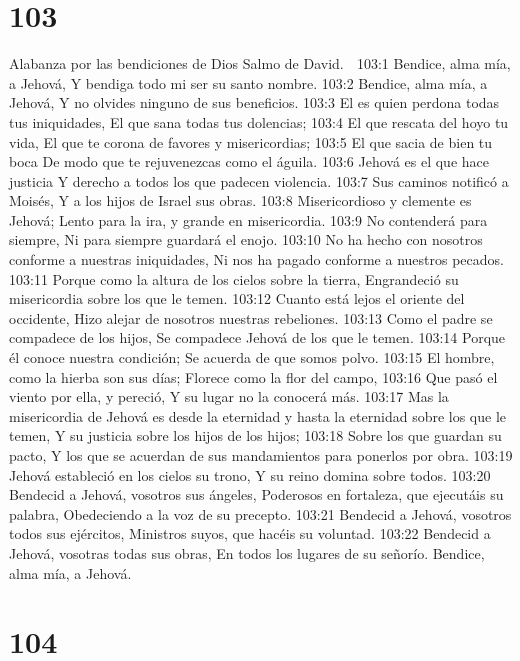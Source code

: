 \chapter{103}

Alabanza por las bendiciones de Dios 
Salmo de David. 

103:1 Bendice, alma mía, a Jehová, 
Y bendiga todo mi ser su santo nombre. 
103:2 Bendice, alma mía, a Jehová, 
Y no olvides ninguno de sus beneficios. 
103:3 El es quien perdona todas tus iniquidades, 
El que sana todas tus dolencias; 
103:4 El que rescata del hoyo tu vida, 
El que te corona de favores y misericordias; 
103:5 El que sacia de bien tu boca 
De modo que te rejuvenezcas como el águila. 
103:6 Jehová es el que hace justicia 
Y derecho a todos los que padecen violencia. 
103:7 Sus caminos notificó a Moisés, 
Y a los hijos de Israel sus obras. 
103:8 Misericordioso y clemente es Jehová; 
Lento para la ira, y grande en misericordia. 
103:9 No contenderá para siempre, 
Ni para siempre guardará el enojo. 
103:10 No ha hecho con nosotros conforme a nuestras iniquidades, 
Ni nos ha pagado conforme a nuestros pecados. 
103:11 Porque como la altura de los cielos sobre la tierra, 
Engrandeció su misericordia sobre los que le temen. 
103:12 Cuanto está lejos el oriente del occidente, 
Hizo alejar de nosotros nuestras rebeliones. 
103:13 Como el padre se compadece de los hijos, 
Se compadece Jehová de los que le temen. 
103:14 Porque él conoce nuestra condición; 
Se acuerda de que somos polvo. 
103:15 El hombre, como la hierba son sus días; 
Florece como la flor del campo, 
103:16 Que pasó el viento por ella, y pereció, 
Y su lugar no la conocerá más. 
103:17 Mas la misericordia de Jehová es desde la eternidad y hasta la eternidad sobre los que le temen, 
Y su justicia sobre los hijos de los hijos; 
103:18 Sobre los que guardan su pacto, 
Y los que se acuerdan de sus mandamientos para ponerlos por obra. 
103:19 Jehová estableció en los cielos su trono, 
Y su reino domina sobre todos. 
103:20 Bendecid a Jehová, vosotros sus ángeles, 
Poderosos en fortaleza, que ejecutáis su palabra, 
Obedeciendo a la voz de su precepto. 
103:21 Bendecid a Jehová, vosotros todos sus ejércitos, 
Ministros suyos, que hacéis su voluntad. 
103:22 Bendecid a Jehová, vosotras todas sus obras, 
En todos los lugares de su señorío. 
Bendice, alma mía, a Jehová. 

\chapter{104}

